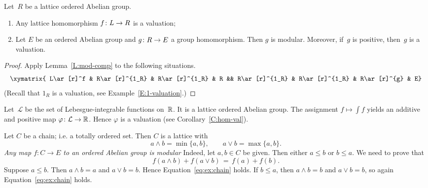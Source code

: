 \documentclass[main.tex]{subfiles}
\begin{document}
\begin{cor}
\label{C:hom-val}
Let~$R$ be a lattice ordered Abelian group.
\begin{enumerate}
\item
\label{C:hom-val-lat}
Any lattice homomorphism $f\colon L\rightarrow R$ 
is a valuation;

\item
\label{C:hom-val-group}
Let $E$ be an ordered Abelian group
and $g\colon R\rightarrow E$ a group homomorphism.
Then $g$ is modular.
Moreover,
if~$g$ is positive,
then~$g$ is a valuation.
\end{enumerate}
\end{cor}
\begin{proof}
Apply Lemma~\ref{L:mod-comp} to the following situations.
\begin{equation*}
\xymatrix{
L\ar[r]^f &
R\ar[r]^{1_R} &
R\ar[r]^{1_R} &
R &&
R\ar[r]^{1_R} &
R\ar[r]^{1_R} &
R\ar[r]^{g} &
E}
\end{equation*}
(Recall that $1_R$ is a valuation,
see Example~\ref{E:1-valuation}.)
\end{proof}

\begin{ex}
\label{E:int-val}
Let~$\mathcal{L}$ be the set of Lebesgue-integrable functions on~$\mathbb{R}$.
It is a lattice ordered Abelian group.
The assignment $f\mapsto \int f$
yields an additive and positive map $\varphi\colon \mathcal{L}\rightarrow \mathbb{R}$.
Hence $\varphi$ is a valuation (see Corollary~\ref{C:hom-val}).
\end{ex}

\begin{ex}
Let $C$ be a chain;
i.e. a totally ordered set.
Then $C$ is a lattice with
\begin{equation*}
a\wedge b = \min\{a,b\},
 \qquad 
a\vee b = \max\{a,b\}.
\end{equation*}
\emph{Any map $f\colon C\rightarrow E$
to an ordered Abelian group is modular}
Indeed,
let $a,b\in C$ be given.
Then either $a\leq b$ or $b\leq a$.
We need to prove that 
\begin{equation}
\label{eq:ex:chain}
f(a\wedge b) + f(a \vee b) \,=\, f(a) + f(b).
\end{equation}
Suppose $a\leq b$. Then $a\wedge b = a$ and $a \vee b= b$.
Hence Equation~\eqref{eq:ex:chain} holds.  
If $b\leq a$, then $a\wedge b = b$ and $a \vee b = b$,
so again Equation~\eqref{eq:ex:chain} holds.
\end{ex}
\end{document}
